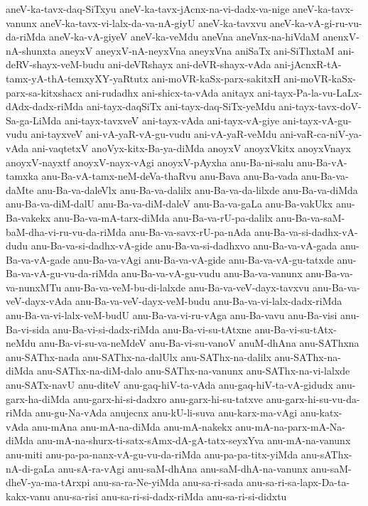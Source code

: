 {aneV-ka-tavx-daq-SiTxyu
aneV-ka-tavx-jAcnx-na-vi-dadx-va-nige
aneV-ka-tavx-vanunx
aneV-ka-tavx-vi-lalx-da-va-nA-giyU
aneV-ka-tavxvu
aneV-ka-vA-gi-ru-vu-da-riMda
aneV-ka-vA-giyeV
aneV-ka-veMdu
aneVna
aneVnx-na-hiVdaM
anenxV-nA-shunxta
aneyxV
aneyxV-nA-neyxVna
aneyxVna
aniSaTx
ani-SiThxtaM
ani-deRV-shayx-veM-budu
ani-deVRshayx
ani-deVR-shayx-vAda
ani-jAcnxR-tA-tamx-yA-thA-temxyXY-yaRtutx
ani-moVR-kaSx-parx-sakitxH
ani-moVR-kaSx-parx-sa-kitxshacx
ani-rudadhx
ani-shicx-ta-vAda
anitayx
ani-tayx-Pa-la-vu-LaLx-dAdx-dadx-riMda
ani-tayx-daqSiTx
ani-tayx-daq-SiTx-yeMdu
ani-tayx-tavx-doV-Sa-ga-LiMda
ani-tayx-tavxveV
ani-tayx-vAda
ani-tayx-vA-giye
ani-tayx-vA-gu-vudu
ani-tayxveV
ani-vA-yaR-vA-gu-vudu
ani-vA-yaR-veMdu
ani-vaR-ca-niV-ya-vAda
ani-vaqtetxV
anoVyx-kitx-Ba-ya-diMda
anoyxV
anoyxVkitx
anoyxVnayx
anoyxV-nayxtf
anoyxV-nayx-vAgi
anoyxV-pAyxha
anu-Ba-ni-salu
anu-Ba-vA-tamxka
anu-Ba-vA-tamx-neM-deVa-thaRvu
anu-Bava
anu-Ba-vada
anu-Ba-va-daMte
anu-Ba-va-daleVlx
anu-Ba-va-dalilx
anu-Ba-va-da-lilxde
anu-Ba-va-diMda
anu-Ba-va-diM-dalU
anu-Ba-va-diM-daleV
anu-Ba-va-gaLa
anu-Ba-vakUkx
anu-Ba-vakekx
anu-Ba-va-mA-tarx-diMda
anu-Ba-va-rU-pa-dalilx
anu-Ba-va-saM-baM-dha-vi-ru-vu-da-riMda
anu-Ba-va-savx-rU-pa-nAda
anu-Ba-va-si-dadhx-vA-dudu
anu-Ba-va-si-dadhx-vA-gide
anu-Ba-va-si-dadhxvo
anu-Ba-va-vA-gada
anu-Ba-va-vA-gade
anu-Ba-va-vAgi
anu-Ba-va-vA-gide
anu-Ba-va-vA-gu-tatxde
anu-Ba-va-vA-gu-vu-da-riMda
anu-Ba-va-vA-gu-vudu
anu-Ba-va-vanunx
anu-Ba-va-va-nunxMTu
anu-Ba-va-veM-bu-di-lalxde
anu-Ba-va-veV-dayx-tavxvu
anu-Ba-va-veV-dayx-vAda
anu-Ba-va-veV-dayx-veM-budu
anu-Ba-va-vi-lalx-dadx-riMda
anu-Ba-va-vi-lalx-veM-budU
anu-Ba-va-vi-ru-vAga
anu-Ba-vavu
anu-Ba-visi
anu-Ba-vi-sida
anu-Ba-vi-si-dadx-riMda
anu-Ba-vi-su-tAtxne
anu-Ba-vi-su-tAtx-neMdu
anu-Ba-vi-su-va-neMdeV
anu-Ba-vi-su-vanoV
anuM-dhAna
anu-SAThxna
anu-SAThx-nada
anu-SAThx-na-dalUlx
anu-SAThx-na-dalilx
anu-SAThx-na-diMda
anu-SAThx-na-diM-dalo
anu-SAThx-na-vanunx
anu-SAThx-na-vi-lalxde
anu-SATx-navU
anu-diteV
anu-gaq-hiV-ta-vAda
anu-gaq-hiV-ta-vA-gidudx
anu-garx-ha-diMda
anu-garx-hi-si-dadxro
anu-garx-hi-su-tatxve
anu-garx-hi-su-vu-da-riMda
anu-gu-Na-vAda
anujecnx
anu-kU-li-suva
anu-karx-ma-vAgi
anu-katx-vAda
anu-mAna
anu-mA-na-diMda
anu-mA-nakekx
anu-mA-na-parx-mA-Na-diMda
anu-mA-na-shurx-ti-satx-sAmx-dA-gA-tatx-seyxYva
anu-mA-na-vanunx
anu-miti
anu-pa-pa-nanx-vA-gu-vu-da-riMda
anu-pa-pa-titx-yiMda
anu-sAThx-nA-di-gaLa
anu-sA-ra-vAgi
anu-saM-dhAna
anu-saM-dhA-na-vanunx
anu-saM-dheV-ya-ma-tArxpi
anu-sa-ra-Ne-yiMda
anu-sa-ri-sada
anu-sa-ri-sa-lapx-Da-ta-kakx-vanu
anu-sa-risi
anu-sa-ri-si-dadx-riMda
anu-sa-ri-si-didxtu
}

